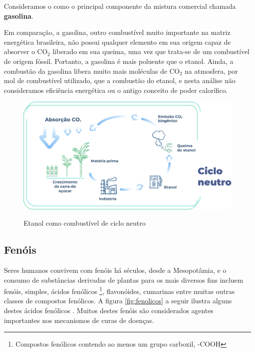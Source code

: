 \begin{tcolorbox}[colback=white!5!white,colframe=orange!90!black,title=\textbf{Equações de combustão do etanol (linha 1) e gasolina (linha 2)}]
	\tcblower
	\vspace{0.5cm}
	
	Consideramos o  como o principal componente da mistura comercial chamada \textbf{gasolina}.
\end{tcolorbox}

Em comparação, a gasolina, outro combustível muito importante na matriz energética brasileira, não possui qualquer elemento em sua origem capaz de absorver o CO$_2$ liberado em sua queima, uma vez que trata-se de um combustível de origem fóssil. Portanto, a gasolina é mais poluente que o etanol. Ainda, a combustão da gasolina libera muito mais moléculas de CO$_2$ na atmosfera, por mol de combustível utilizado, que a combustão do etanol, e nesta análise não consideramos eficiência energética ou o antigo conceito de poder calorífico.

 \begin{figure}[h]
 	\centering
 	\caption{Etanol como combustível de ciclo neutro}
 	\vspace{0.5cm}
 	\includegraphics[width=0.75\linewidth]{imagens/ciclo-neutro.png}
 	\label{fig:neutro}
 \end{figure}

 \subsection{Fenóis}
Seres humanos convivem com fenóis há séculos, desde a Mesopotâmia, e o consumo de substâncias derivadas de plantas para os mais diversos fins incluem fenóis, simples, ácidos fenólicos \footnote{Compostos fenólicos contendo ao menos um grupo carboxil, -COOH}, flavonóides, cumarinas entre muitas outras classes de compostos fenólicos. A figura \ref{fig:fenolicos} a seguir ilustra alguns destes ácidos fenólicos \cite{fenolicos}. Muitos destes fenóis são considerados agentes importantes nos mecanismos de curas de doenças.

